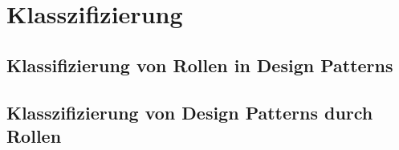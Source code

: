 \section{Klasszifizierung}

\subsection{Klassifizierung von Rollen in Design Patterns}

\subsection{Klasszifizierung von Design Patterns durch Rollen}